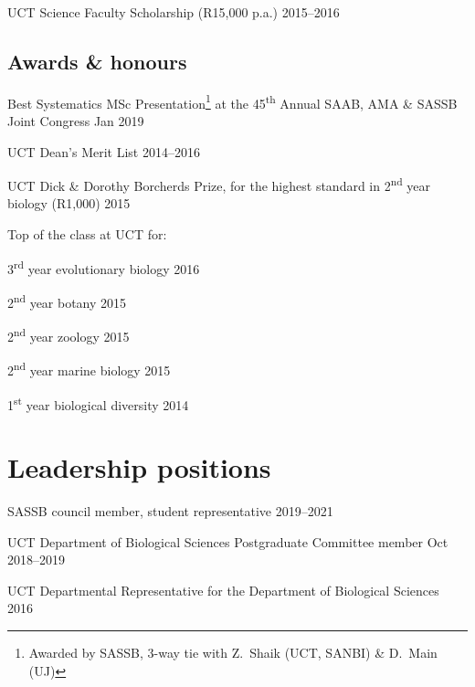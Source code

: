 \documentclass[10pt]{article}
\begin{document}
UCT Science Faculty Scholarship (R15,000 p.a.)                 \hfill 2015--2016

\subsection*{Awards \& honours}

Best Systematics MSc Presentation\footnote{Awarded by SASSB,
  3-way tie with Z.~Shaik (UCT, SANBI) \& D.~Main (UJ)}
  at the 45\textsuperscript{th}
  Annual SAAB, AMA \& SASSB Joint Congress                       \hfill Jan 2019

UCT Dean's Merit List                                          \hfill 2014--2016

UCT Dick \& Dorothy Borcherds Prize, for the highest standard in 
  2\textsuperscript{nd} year biology (R1,000)                        \hfill 2015

Top of the class at UCT for:

\hspace{2em} 3\textsuperscript{rd} year evolutionary biology         \hfill 2016

\hspace{2em} 2\textsuperscript{nd} year botany                       \hfill 2015 

\hspace{2em} 2\textsuperscript{nd} year zoology                      \hfill 2015

\hspace{2em} 2\textsuperscript{nd} year marine biology               \hfill 2015

\hspace{2em} 1\textsuperscript{st} year biological diversity         \hfill 2014

\section*{Leadership positions} %

SASSB council member, student representative                   \hfill 2019--2021

UCT Department of Biological Sciences Postgraduate Committee member
                                                           \hfill Oct 2018--2019

UCT Departmental Representative for the Department of Biological Sciences
                                                                     \hfill 2016
\end{document}
